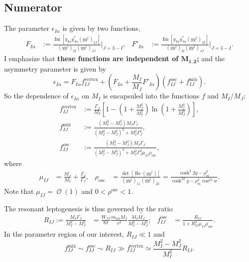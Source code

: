 \documentclass[a4paper,11pt,captions=tableheading,DIV=12]{scrartcl}
\numberwithin{equation}{section}
\newcommand\w[1]{_{\mathrm{#1}}}
\DeclareMathOperator{\Order}{\mathcal{O}}
\renewcommand{\Re}{\mathop{\mathrm{Re}}}
\renewcommand{\Im}{\mathop{\mathrm{Im}}}
\newcommand\mtot{m_{\mathrm{tot}}}
\begin{document}
\subsection{Numerator}
The parameter $\epsilon_{I\alpha}$ is given by two functions,
\begin{align}
 F_{I\alpha} &:= \frac{\Im\left[y_{I\alpha}y^*_{J\alpha}(y y^\dagger)_{IJ}\right]}
{(y y^\dagger)_{II}(y y^\dagger)_{JJ}}\Bigg|_{J=3-I},
&
 F'_{I\alpha} &:= \frac{\Im\left[y_{I\alpha}y^*_{J\alpha}(y y^\dagger)_{JI}\right]}
{(y y^\dagger)_{II}(y y^\dagger)_{JJ}}\Bigg|_{J=3-I}.
\end{align}
I emphasize that \textbf{these functions are independent of $\boldsymbol{M_{1,2}}$;} and the asymmetry parameter is given by
\begin{equation}
 \epsilon_{I\alpha} = F_{I\alpha}f^{\mathrm{vertex}}_{IJ}+\left(
F_{I\alpha} + \frac{M_I}{M_J}F'_{I\alpha}
\right)(f^{\mathrm{osc}}_{IJ} + f^{\mathrm{mix}}_{IJ}).
\end{equation}
So the dependence of $\epsilon_{I\alpha}$ on $M_I$ is encapsuled into the functions $f$ and $M_I/M_J$:
\begin{align}
 f^{\text{vertex}}_{IJ}
&:= \frac{\Gamma_J}{M_I}
\left[1-\left(1+\frac{M_J^2}{M_I^2}\right)\ln\left(1+\frac{M_I^2}{M_J^2}\right)\right],\\
 f^{\text{mix}}_{IJ}
&:= \frac{(M_I^2-M_J^2)M_I \Gamma_J}
         {(M_I^2-M_J^2)^2+M_I^2\Gamma_J^2},\\
 f^{\text{osc}}_{IJ}
&:= \frac{(M_I^2-M_J^2)M_I \Gamma_J}
         {(M_I^2-M_J^2)^2+M_I^2\Gamma_J^2 \mu_{IJ}\rho\w{osc}},
\end{align}
where
\begin{align}
 \mu_{IJ}&=\frac{M_J}{M_I} + \frac{\Gamma_I}{\Gamma_J},
&
 \rho\w{osc} &= \frac{\det\left[\Re(yy^\dagger)\right]}{(yy^\dagger)_{11}(yy^\dagger)_{22}}
= \frac{\cosh^2 2y-\rho_m^2}{\cosh^22y-\rho_m^2\cos^22w}.
\end{align}
Note that $\mu_{IJ}=\Order(1)$ and $0<\rho^{\mathrm{osc}}<1$.

The resonant leptogenesis is thus governed by the ratio
\begin{align}
 R_{IJ} := \frac{M_I\Gamma_J}{M_I^2-M_J^2}
&= \frac{W_{JJ}}{8\pi}\frac{\mtot M_J}{v^2}\frac{M_IM_J}{M_I^2-M_J^2};
&
 f^{\mathrm{osc}}_{IJ}
&= \frac{R_{IJ}}{1+R_{IJ}^2\mu_{IJ}\rho\w{osc}}.
\end{align}
In the parameter region of our interest, $R_{IJ}\ll 1$ and
\begin{equation}
 f_{IJ}^{\mathrm{mix}}\sim f_{IJ}^{\mathrm{osc}}\sim R_{IJ}
\gg
 f_{IJ}^{\mathrm{vertex}}\simeq\frac{M_I^2 - M_J^2}{M_I^2}R_{IJ}.
\end{equation}
\end{document}
